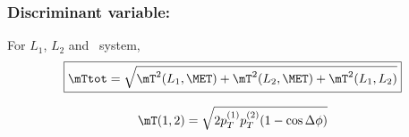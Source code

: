 \begin{frame}
\frametitle{Discriminant variable: \mTtot}
\manip For $L_1$, $L_2$ and \MET\ system,
\begin{equation*}
\boxed{\mTtot = \sqrt{\mT^2(L_1,\MET) + \mT^2(L_2,\MET) + \mT^2(L_1,L_2)}}
\end{equation*}
\begin{minipage}[c]{.6\textwidth}
\begin{equation*}
\mT(1,2) = \sqrt{2p_T^{(1)} p_T^{(2)} (1-\cos\Delta\phi)}
\end{equation*}
\end{minipage}
\begin{minipage}[c]{.35\textwidth}
\begin{center}
\end{center}
\end{minipage}
\end{frame}
